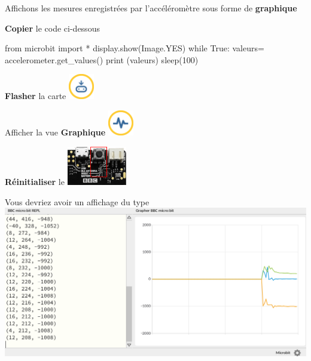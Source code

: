 \begin{methode}[Graphique]
	Affichons les mesures enregistrées
	par l'accéléromètre sous forme de \textbf{graphique}

	\begin{multicols}{2}

		\textbf{Copier} le code ci-dessous
		\begin{mucode}
from microbit import *
display.show(Image.YES)
while True:
    valeurs= accelerometer.get_values()
    print (valeurs)
    sleep(100)
		\end{mucode}
	
		\textbf{Flasher} la carte 
		\hfill\includegraphics[width=3em,valign=t]{res/flash.png}
	
		Afficher la vue \textbf{Graphique}
		\hfill\includegraphics[width=3em,valign=t]{res/plotter.png}
	
		\textbf{Réinitialiser} le \mb
		\hfill\includegraphics[width=7em,valign=c]{res/mu/060.png}
	
	\end{multicols}

\end{methode}


\begin{remarque}
	Vous devriez avoir un affichage du type\\
		
	\includegraphics[width=\linewidth,valign=t]{res/mu/090.png}
\end{remarque}
